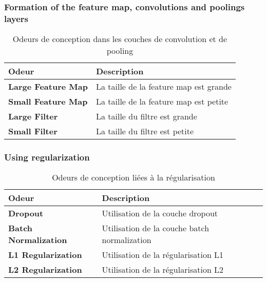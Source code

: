 \subsubsection{Formation of the feature map, convolutions and poolings layers}

\begin{table}[h]
    \centering
    \caption{Odeurs de conception dans les couches de convolution et de pooling}
    \label{tab:convolutionalSmellsConv}
    \begin{tabular}{|l|l|}
        \hline
        \textbf{Odeur}             & \textbf{Description}                   \\ \hline
        \textbf{Large Feature Map} & La taille de la feature map est grande \\ \hline
        \textbf{Small Feature Map} & La taille de la feature map est petite \\ \hline
        \textbf{Large Filter}      & La taille du filtre est grande         \\ \hline
        \textbf{Small Filter}      & La taille du filtre est petite         \\ \hline
    \end{tabular}
\end{table}


\subsubsection{Using regularization}

\begin{table}[h]
    \centering
    \caption{Odeurs de conception liées à la régularisation}
    \label{tab:convolutionalSmellsReg}
    \begin{tabular}{|l|l|}
        \hline
        \textbf{Odeur}               & \textbf{Description}                         \\ \hline
        \textbf{Dropout}             & Utilisation de la couche dropout             \\ \hline
        \textbf{Batch Normalization} & Utilisation de la couche batch normalization \\ \hline
        \textbf{L1 Regularization}   & Utilisation de la régularisation L1          \\ \hline
        \textbf{L2 Regularization}   & Utilisation de la régularisation L2          \\ \hline
    \end{tabular}
\end{table}




